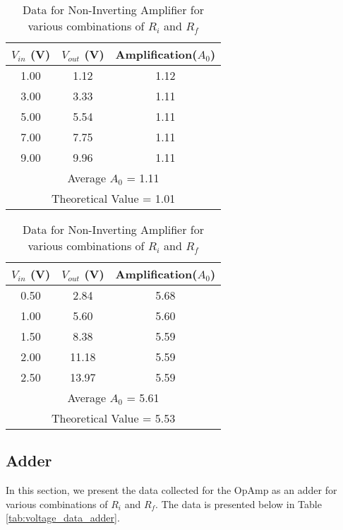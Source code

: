 \documentclass[12pt]{article}
\begin{document}
\begin{table}[H]
  \begin{subtable}{0.48\textwidth}
    \centering
    \begin{tabular}{|c|c|c|}
        \hline
        $V_{in}$ (V) & $V_{out}$ (V) & Amplification($A_0$) \\
        \hline
        1.00 & 1.12 & 1.12 \\
        3.00 & 3.33 & 1.11 \\
        5.00 & 5.54 & 1.11 \\
        7.00 & 7.75 & 1.11 \\
        9.00 & 9.96 & 1.11 \\
        \hline
        \multicolumn{3}{|c|}{Average $A_0$ = 1.11} \\
        \multicolumn{3}{|c|}{Theoretical Value = 1.01} \\
        \hline
    \end{tabular}
    \caption{$R_i=21800\Omega, R_f=2170\Omega$}
\end{subtable}
\hfill
\begin{subtable}{0.48\textwidth}
    \centering
    \begin{tabular}{|c|c|c|}
        \hline
        $V_{in}$ (V) & $V_{out}$ (V) & Amplification($A_0$) \\
        \hline
        0.50 & 2.84 & 5.68 \\
        1.00 & 5.60 & 5.60 \\
        1.50 & 8.38 & 5.59 \\
        2.00 & 11.18 & 5.59 \\
        2.50 & 13.97 & 5.59 \\
        \hline
        \multicolumn{3}{|c|}{Average $A_0$ = 5.61} \\
        \multicolumn{3}{|c|}{Theoretical Value = 5.53} \\
        \hline
    \end{tabular}
    \caption{$R_i=2170\Omega, R_f=9850\Omega$}
\end{subtable}
  
  \caption{Data for Non-Inverting Amplifier for various combinations of $R_i$ and $R_f$}
  \label{tab:combined2}
\end{table}

\subsection*{Adder}

In this section, we present the data collected for the OpAmp as an adder for various combinations of $R_i$ and $R_f$. The data is presented below in Table \ref{tab:voltage_data_adder}.
\end{document}
